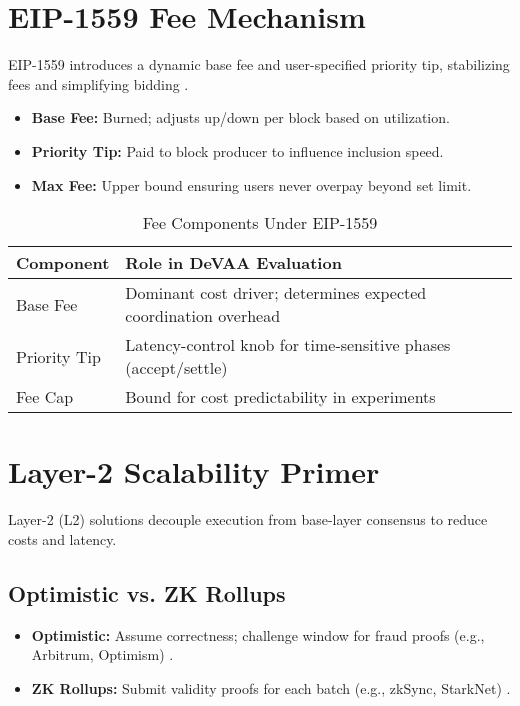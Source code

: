 \section{EIP-1559 Fee Mechanism}

EIP-1559 introduces a dynamic base fee and user-specified priority tip, stabilizing fees and simplifying bidding \citep{roughgarden2021eip1559}.
\begin{itemize}
    \item \textbf{Base Fee:} Burned; adjusts up/down per block based on utilization.
    \item \textbf{Priority Tip:} Paid to block producer to influence inclusion speed.
    \item \textbf{Max Fee:} Upper bound ensuring users never overpay beyond set limit.
\end{itemize}

\begin{table}[h]
\centering
\caption{Fee Components Under EIP-1559}
\label{tab:eip1559}
\begin{tabular}{p{3.5cm}p{10cm}}
\toprule
\textbf{Component} & \textbf{Role in DeVAA Evaluation} \\
\midrule
Base Fee & Dominant cost driver; determines expected coordination overhead \\
Priority Tip & Latency-control knob for time-sensitive phases (accept/settle) \\
Fee Cap & Bound for cost predictability in experiments \\
\bottomrule
\end{tabular}
\end{table}

\section{Layer-2 Scalability Primer}

Layer-2 (L2) solutions decouple execution from base-layer consensus to reduce costs and latency.
\subsection{Optimistic vs. ZK Rollups}
\begin{itemize}
    \item \textbf{Optimistic:} Assume correctness; challenge window for fraud proofs (e.g., Arbitrum, Optimism) \citep{kalodner2023arbitrum}.
    \item \textbf{ZK Rollups:} Submit validity proofs for each batch (e.g., zkSync, StarkNet) \citep{gluchowski2021zksync}.
\end{itemize}

